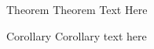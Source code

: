 \documentclass{beamer}
\begin{document}
    \begin{frame}
        \begin{block}{Theorem}
            Theorem Text Here
        \end{block}

        \vfill \pause 


        \vfill \pause

        \begin{block}{Corollary}
            Corollary text here
        \end{block}        

    \end{frame}
\end{document}
